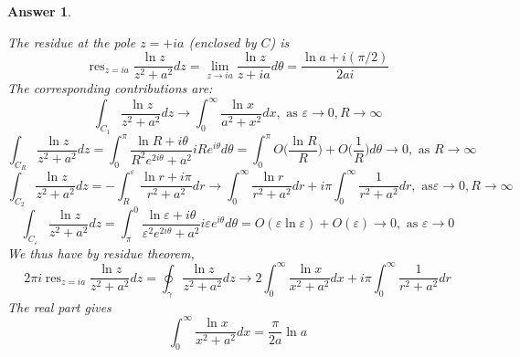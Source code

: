 \documentclass[a4paper]{article}
\DeclareMathOperator{\res}{res}
\newtheorem{ans}{Answer}[section]
\theoremstyle{new}
\begin{document}
\begin{ans}
\begin{enumerate}[label=(\alph*)]
\begin{center}
  \end{center}
\end{enumerate}
The residue at the pole $z=+ia$ (enclosed by $C$) is
$$\res_{z=ia}\frac{\ln z}{z^2+a^2}dz=\lim_{z\rightarrow ia}\frac{\ln z}{z+ia}d\theta =\frac{\ln a+i(\pi/2)}{2ai}$$
The corresponding contributions are:
$$\int_{C_1}\frac{\ln z}{z^2+a^2}dz\rightarrow\int_0^\infty\frac{\ln x}{a^2+x^2}dx,\text{ as }\varepsilon\rightarrow 0,R\rightarrow\infty$$
$$\int_{C_R}\frac{\ln z}{z^2+a^2}dz=\int_0^\pi\frac{\ln R+i\theta}{R^2e^{2i\theta}+a^2}iRe^{i\theta}d\theta=\int_0^\pi O\bigg(\frac{\ln R}{R}\bigg)+O\bigg(\frac{1}{R}\bigg)d\theta\rightarrow 0,\text{ as }R\rightarrow\infty$$
$$\int_{C_2}\frac{\ln z}{z^2+a^2}dz=-\int_R^{\varepsilon}\frac{\ln r+i\pi}{r^2+a^2}dr\rightarrow\int_0^\infty\frac{\ln r}{r^2+a^2}dr+i\pi\int_0^\infty\frac{1}{r^2+a^2}dr,\text{ as} \varepsilon\rightarrow 0,R\rightarrow\infty$$
$$\int_{C_\varepsilon}\frac{\ln z}{z^2+a^2}dz=\int_\pi^0\frac{\ln\varepsilon+i\theta}{\varepsilon^2e^{2i\theta}+a^2}i\varepsilon e^{i\theta}d\theta=O(\varepsilon\ln\varepsilon)+O(\varepsilon)\rightarrow 0,\text{ as }\varepsilon\rightarrow 0$$
We thus have by residue theorem,
$$2\pi i\res_{z=ia}\frac{\ln z}{z^2+a^2}dz=\oint_\gamma\frac{\ln z}{z^2+a^2}dz\rightarrow 2\int_0^\infty\frac{\ln x}{x^2+a^2}dx+i\pi\int_0^\infty\frac{1}{r^2+a^2}dr$$
The real part gives
$$\int_0^\infty\frac{\ln x}{x^2+a^2}dx=\frac{\pi}{2a}\ln a$$
\end{ans}
\newpage
\end{document}
